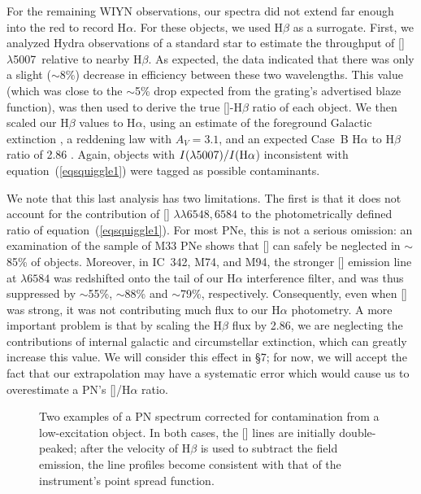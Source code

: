 \documentclass[12pt,preprint]{emulateapj}
\newcommand{\Oline}{[\ion{O}{3}]~$\lambda$5007}
\begin{document}
For the remaining WIYN observations, our spectra did not extend far enough into the red to record H$\alpha$.  For these objects, we used H$\beta$ as a surrogate.  First, we analyzed Hydra observations of a standard star to estimate the throughput of \Oline\ relative to nearby H$\beta$.  As expected, the data indicated that there was only a slight ($\sim$8\%) decrease in efficiency between these two wavelengths.  This value (which was close to the $\sim$5\% drop expected from the grating's advertised blaze function), was then used to derive the true []-H$\beta$ ratio of each object. We then scaled our H$\beta$ values to H$\alpha$, using an estimate of the foreground Galactic extinction \citep{sfd98}, a \citet{ccm89} reddening law with $A_V = 3.1$, and an expected Case~B H$\alpha$ to H$\beta$ ratio of 2.86 \citep{brocklehurst}.  Again, objects with $I(\lambda 5007)/I({\rm H}\alpha$) inconsistent with equation~(\ref{eqsquiggle1}) were tagged as possible contaminants.

We note that this last analysis has two limitations.  The first is that it does not account for the contribution of [] $\lambda\lambda 6548,6584$ to the photometrically defined ratio of equation~(\ref{eqsquiggle1}).  For most PNe, this is not a serious omission: an examination of the \citet{M33} sample of M33 PNe shows that [] can safely be neglected in $\sim$85\% of objects.  Moreover, in IC~342, M74, and M94, the stronger [] emission line at $\lambda 6584$ was redshifted onto the tail of our H$\alpha$ interference filter, and was thus suppressed by $\sim$55\%, $\sim$88\% and $\sim$79\%, respectively.  Consequently, even when [] was strong, it was not contributing much flux to our H$\alpha$ photometry.  A more important problem is that by scaling the H$\beta$ flux by 2.86, we are neglecting the contributions of internal galactic and circumstellar extinction, which can greatly increase this value.  We will consider this effect in \S 7; for now, we will accept the fact that our extrapolation may have a systematic error which would cause us to overestimate a PN's []/H$\alpha$ ratio.

\begin{figure}[t]
\caption{Two examples of a PN spectrum corrected for contamination from a low-excitation object.  In both cases, the [] lines are initially double-peaked; after the velocity of H$\beta$ is used to subtract the field emission, the line profiles become consistent with that of the instrument's point spread function. \label{befaft} }
\end{figure}
\end{document}

